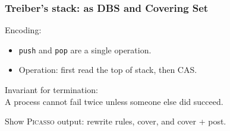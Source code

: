 \documentclass{beamer}
\newcommand{\picasso}{\textsc{Picasso}\xspace}
\begin{document}
\begin{frame}
  \frametitle{Treiber's stack: as DBS and Covering Set}
  Encoding:
  \begin{itemize}
  \item {\tt push} and {\tt pop} are a single operation.
  \item Operation: first read the top of stack, then CAS.
  \end{itemize}

  \vspace{2ex}

  Invariant for termination:\\
  A process cannot fail twice unless someone else did succeed. 
  
  \vspace{2ex}

  \begin{center}
  Show \picasso output: rewrite rules, cover, and cover + post.
  \end{center}

\end{frame}
\end{document}
